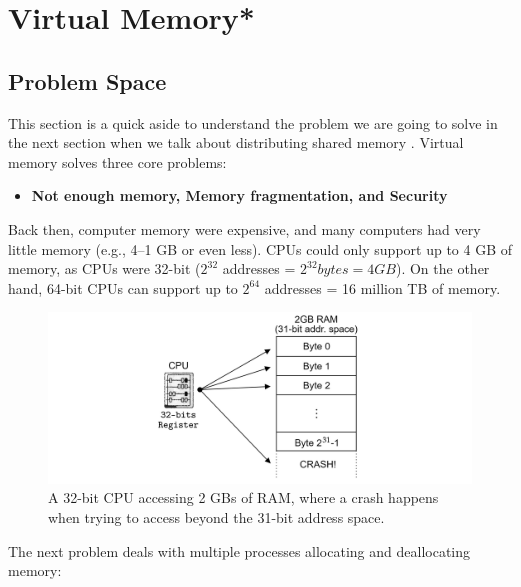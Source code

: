 \section{Virtual Memory*}
\subsection{Problem Space}
\noindent
This section is a quick aside to understand the problem we are going 
to solve in the next section when we talk about distributing shared memory \cite{virtualmemory2023}. Virtual memory solves three core problems:
\begin{itemize}
    \item \textbf{Not enough memory, Memory fragmentation, and Security}
\end{itemize}
\begin{Def}

    Back then, computer memory were expensive, and many computers had very little memory (e.g., 4--1 GB or even less).
    CPUs could only support up to 4 GB of memory, as CPUs were 32-bit ($2^{32}$ addresses = $2^{32} bytes  = 4 GB$). 
    On the other hand, 64-bit CPUs can support up to $2^{64}$ addresses = 16 million TB of memory.\\
\end{Def}

\begin{figure}[h]
    \centering
    \includegraphics[width=\textwidth]{Sections/virt/crash.png}
    
    \vspace{1em}
    \caption{A 32-bit CPU accessing 2 GBs of RAM, where a crash happens when trying to access beyond the 31-bit address space.}
    
    \label{fig:virt1}
\end{figure}
\newpage 

\noindent
The next problem deals with multiple processes allocating and deallocating memory:


